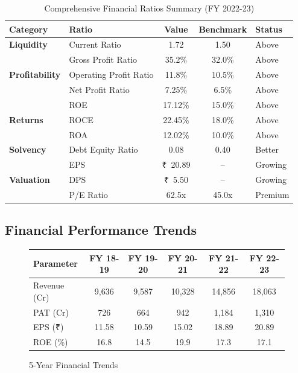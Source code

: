 \documentclass[12pt,a4paper]{article}
\newcommand{\rupee}{₹}
\begin{document}
\begin{table}[H]
    \centering
    \caption{Comprehensive Financial Ratios Summary (FY 2022-23)}
    \begin{tabular}{|l|l|c|c|l|}
        \hline
        \textbf{Category} & \textbf{Ratio} & \textbf{Value} & \textbf{Benchmark} & \textbf{Status} \\
        \hline
        \textbf{Liquidity} & Current Ratio & 1.72 & 1.50 & \textcolor{statusgood}{Above} \\
        \hline
        \multirow{3}{*}{\textbf{Profitability}} & Gross Profit Ratio & 35.2\% & 32.0\% & \textcolor{statusgood}{Above} \\
        & Operating Profit Ratio & 11.8\% & 10.5\% & \textcolor{statusgood}{Above} \\
        & Net Profit Ratio & 7.25\% & 6.5\% & \textcolor{statusgood}{Above} \\
        \hline
        \multirow{3}{*}{\textbf{Returns}} & ROE & 17.12\% & 15.0\% & \textcolor{statusgood}{Above} \\
        & ROCE & 22.45\% & 18.0\% & \textcolor{statusgood}{Above} \\
        & ROA & 12.02\% & 10.0\% & \textcolor{statusgood}{Above} \\
        \hline
        \textbf{Solvency} & Debt Equity Ratio & 0.08 & 0.40 & \textcolor{statusgood}{Better} \\
        \hline
        \multirow{3}{*}{\textbf{Valuation}} & EPS & \rupee~20.89 & -- & Growing \\
        & DPS & \rupee~5.50 & -- & Growing \\
        & P/E Ratio & 62.5x & 45.0x & Premium \\
        \hline
    \end{tabular}
\end{table}

\subsection{Financial Performance Trends}

\begin{figure}[H]
    \centering
    \begin{tabular}{|l|c|c|c|c|c|}
        \hline
        \textbf{Parameter} & \textbf{FY 18-19} & \textbf{FY 19-20} & \textbf{FY 20-21} & \textbf{FY 21-22} & \textbf{FY 22-23} \\
        \hline
        Revenue (Cr) & 9,636 & 9,587 & 10,328 & 14,856 & 18,063 \\
        \hline
        PAT (Cr) & 726 & 664 & 942 & 1,184 & 1,310 \\
        \hline
        EPS (\rupee) & 11.58 & 10.59 & 15.02 & 18.89 & 20.89 \\
        \hline
        ROE (\%) & 16.8 & 14.5 & 19.9 & 17.3 & 17.1 \\
        \hline
    \end{tabular}
    \caption{5-Year Financial Trends}
\end{figure}
\end{document}
